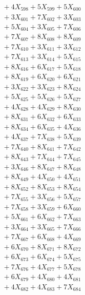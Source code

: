 \documentclass[a4paper,10pt]{article}
\begin{document}
{\begin{align}
&\;  + 4 X_{598} + 5 X_{599} + 5 X_{600} \\[0.3ex]
&\;  + 3 X_{601} + 7 X_{602} + 3 X_{603} \\[0.3ex]
&\;  + 5 X_{604} + 3 X_{605} + 7 X_{606} \\[0.3ex]
&\;  + 7 X_{607} + 8 X_{608} + 8 X_{609} \\[0.5ex]\allowbreak
&\;  + 7 X_{610} + 3 X_{611} + 3 X_{612} \\[0.3ex]
&\;  + 7 X_{613} + 3 X_{614} + 5 X_{615} \\[0.3ex]
&\;  + 8 X_{616} + 6 X_{617} + 5 X_{618} \\[0.3ex]
&\;  + 8 X_{619} + 6 X_{620} + 6 X_{621} \\[0.3ex]
&\;  + 3 X_{622} + 3 X_{623} + 8 X_{624} \\[0.3ex]
&\;  + 5 X_{625} + 5 X_{626} + 5 X_{627} \\[0.3ex]
&\;  + 4 X_{628} + 4 X_{629} + 8 X_{630} \\[0.3ex]
&\;  + 8 X_{631} + 6 X_{632} + 6 X_{633} \\[0.3ex]
&\;  + 8 X_{634} + 6 X_{635} + 4 X_{636} \\[0.3ex]
&\;  + 4 X_{637} + 7 X_{638} + 5 X_{639} \\[0.5ex]\allowbreak
&\;  + 7 X_{640} + 8 X_{641} + 7 X_{642} \\[0.3ex]
&\;  + 8 X_{643} + 7 X_{644} + 7 X_{645} \\[0.3ex]
&\;  + 3 X_{646} + 8 X_{647} + 8 X_{648} \\[0.3ex]
&\;  + 8 X_{649} + 4 X_{650} + 4 X_{651} \\[0.3ex]
&\;  + 8 X_{652} + 8 X_{653} + 8 X_{654} \\[0.3ex]
&\;  + 7 X_{655} + 3 X_{656} + 5 X_{657} \\[0.3ex]
&\;  + 7 X_{658} + 3 X_{659} + 6 X_{660} \\[0.3ex]
&\;  + 5 X_{661} + 6 X_{662} + 7 X_{663} \\[0.3ex]
&\;  + 3 X_{664} + 3 X_{665} + 7 X_{666} \\[0.3ex]
&\;  + 7 X_{667} + 6 X_{668} + 4 X_{669} \\[0.5ex]\allowbreak
&\;  + 6 X_{670} + 8 X_{671} + 8 X_{672} \\[0.3ex]
&\;  + 6 X_{673} + 6 X_{674} + 5 X_{675} \\[0.3ex]
&\;  + 7 X_{676} + 4 X_{677} + 5 X_{678} \\[0.3ex]
&\;  + 6 X_{679} + 4 X_{680} + 4 X_{681} \\[0.3ex]
&\;  + 4 X_{682} + 4 X_{683} + 7 X_{684} \\[0.3ex]

\end{align}}
\end{document}

